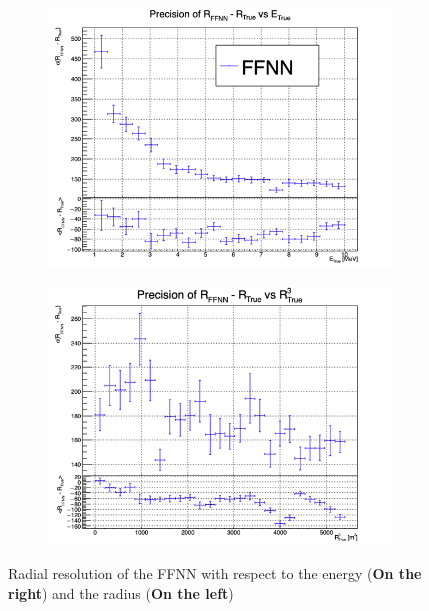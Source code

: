 \documentclass[../main.tex]{subfiles}
\begin{document}
\begin{figure}[ht]
  \centering
  \begin{subfigure}[t]{0.48\linewidth}
    \includegraphics[width=\linewidth]{images/janne/ffnn/SBE.png}
  \end{subfigure}
  \hfill
  \begin{subfigure}[t]{0.48\linewidth}
    \includegraphics[width=\linewidth]{images/janne/ffnn/SBR.png}
  \end{subfigure}
  \caption{Radial resolution of the FFNN with respect to the energy (\textbf{On the right}) and the radius (\textbf{On the left})}
  \label{fig:janne:ffnn:SB}
\end{figure}
\end{document}
